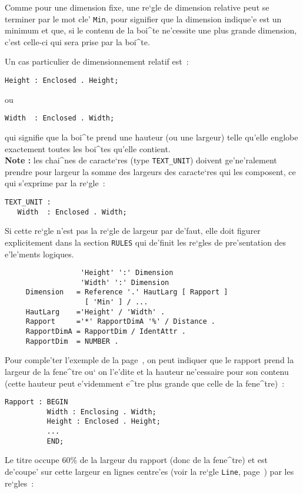 {Comme pour une dimension fixe, une re`gle de dimension relative peut se
terminer par le mot cle' {\tt Min}, pour signifier que
la dimension indique'e est un minimum et que, si le contenu de la boi^te
ne'cessite une plus grande dimension, c'est celle-ci qui sera prise par
la boi^te.

Un cas particulier de dimensionnement relatif est~:
\begin{verbatim}
Height : Enclosed . Height;
\end{verbatim}
ou
\begin{verbatim}
Width  : Enclosed . Width;
\end{verbatim}
qui signifie que la boi^te prend une hauteur (ou une largeur) telle qu'elle
englobe exactement toutes les boi^tes qu'elle contient.\\

{\bf Note :} les chai^nes de caracte`res (type {\tt TEXT\_UNIT}) doivent
ge'ne'ralement prendre pour largeur la somme des largeurs des caracte`res qui
les composent, ce qui s'exprime par la re`gle~:
\begin{verbatim}
TEXT_UNIT :
   Width  : Enclosed . Width;
\end{verbatim}
Si cette re`gle n'est pas la re`gle de largeur par de'faut, elle doit figurer
explicitement dans la section {\tt RULES} qui de'finit les re`gles de
pre'sentation des e'le'ments logiques.

\begin{verbatim}
                  'Height' ':' Dimension
                  'Width' ':' Dimension
     Dimension   = Reference '.' HautLarg [ Rapport ]
                   [ 'Min' ] / ...
     HautLarg    ='Height' / 'Width' .
     Rapport     ='*' RapportDimA '%' / Distance .
     RapportDimA = RapportDim / IdentAttr .
     RapportDim  = NUMBER .
\end{verbatim}

\begin{example}
Pour comple'ter l'exemple de la page~\pageref{expos1}, on peut indiquer que
le rapport prend la largeur de la fene^tre ou` on l'e'dite et la hauteur
ne'cessaire pour son contenu (cette hauteur peut e'videmment e^tre plus
grande que celle de la fene^tre)~:

\begin{verbatim}
Rapport : BEGIN
          Width : Enclosing . Width;
          Height : Enclosed . Height;
          ...
          END;
\end{verbatim}
Le titre occupe 60\% de la largeur du rapport (donc de la fene^tre) et est
de'coupe' sur cette largeur en lignes centre'es (voir la re`gle {\tt Line},
page~\pageref{regleline}) par les re`gles~:


\end{example}}
